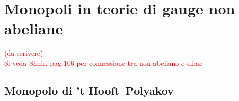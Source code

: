 \chapter{Monopoli in teorie di gauge non abeliane}
\textcolor{red}{(da scrivere)}\\
\textcolor{red}{Si veda Shnir, pag 106 per connessione tra non abeliano e dirac}\\
\section{Monopolo di ’t Hooft–Polyakov}
